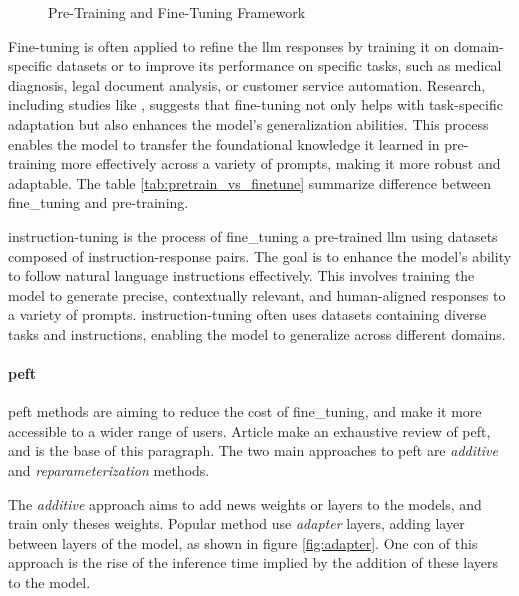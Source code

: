 \begin{figure}[h]
    \centering
    
    \caption{Pre-Training and Fine-Tuning Framework}
    \label{fig:pretrain_finetune}
\end{figure}

Fine-tuning is often applied to refine the \acrshort{llm} responses by training it on domain-specific datasets or to improve its performance on specific tasks, such as medical diagnosis, legal document analysis, or customer service automation. Research, including studies like \cite{wei_finetuned_2022}, suggests that fine-tuning not only helps with task-specific adaptation but also enhances the model's generalization abilities. This process enables the model to transfer the foundational knowledge it learned in pre-training more effectively across a variety of prompts, making it more robust and adaptable. The table \ref{tab:pretrain_vs_finetune} summarize difference between \gls{fine_tuning} and \gls{pre-training}.



\Gls{instruction-tuning} is the process of \gls{fine_tuning} a pre-trained \acrshort{llm} using datasets composed of instruction-response pairs. The goal is to enhance the model's ability to follow natural language instructions effectively. This involves training the model to generate precise, contextually relevant, and human-aligned responses to a variety of prompts. \Gls{instruction-tuning} often uses datasets containing diverse tasks and instructions, enabling the model to generalize across different domains. 

\paragraph{\acrfull{peft}}

\acrshort{peft} methods are aiming to reduce the cost of \gls{fine_tuning}, and make it more accessible to a wider range of users. Article \cite{han_parameter-efficient_2024} make an exhaustive review of \acrshort{peft}, and is the base of this paragraph. The two main approaches to \acrshort{peft} are \textit{additive} and \textit{reparameterization} methods.

The \textit{additive} approach aims to add news weights or layers to the models, and train only theses weights. Popular method  use \textit{adapter} layers, adding layer between layers of the model, as shown in figure \ref{fig:adapter}. One con of this approach is the rise of the inference time implied by the addition of these layers to the model.


